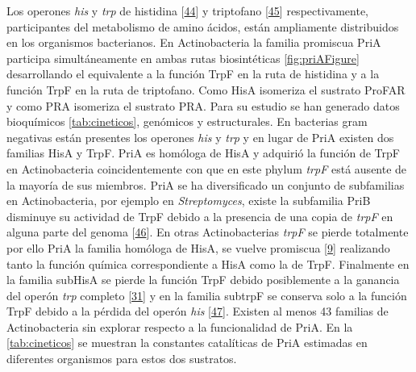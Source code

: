 \documentclass[12pt,twoside]{reedthesis}
\begin{document}
  Los operones \emph{his} y \emph{trp} de histidina
  {[}\protect\hyperlink{ref-fondi_evolution_2009}{44}{]} y triptofano
  {[}\protect\hyperlink{ref-merino_evolution_2008}{45}{]} respectivamente,
  participantes del metabolismo de amino ácidos, están ampliamente
  distribuidos en los organismos bacterianos. En Actinobacteria la familia
  promiscua PriA participa simultáneamente en ambas rutas biosintéticas
  \autoref{fig:priAFigure} desarrollando el equivalente a la función TrpF
  en la ruta de histidina y a la función TrpF en la ruta de triptofano.
  Como HisA isomeriza el sustrato ProFAR y como PRA isomeriza el sustrato
  PRA. Para su estudio se han generado datos bioquímicos
  \autoref{tab:cineticos}, genómicos y estructurales. En bacterias gram
  negativas están presentes los operones \emph{his} y \emph{trp} y en
  lugar de PriA existen dos familias HisA y TrpF. PriA es homóloga de HisA
  y adquirió la función de TrpF en Actinobacteria coincidentemente con que
  en este phylum \emph{trpF} está ausente de la mayoría de sus miembros.
  PriA se ha diversificado un conjunto de subfamilias en Actinobacteria,
  por ejemplo en \emph{Streptomyces}, existe la subfamilia PriB disminuye
  su actividad de TrpF debido a la presencia de una copia de \emph{trpF}
  en alguna parte del genoma
  {[}\protect\hyperlink{ref-verduzco-castro_co-occurrence_2016}{46}{]}. En
  otras Actinobacterias \emph{trpF} se pierde totalmente por ello PriA la
  familia homóloga de HisA, se vuelve promiscua
  {[}\protect\hyperlink{ref-baronagomez_occurrence_2003}{9}{]} realizando
  tanto la función química correspondiente a HisA como la de TrpF.
  Finalmente en la familia subHisA se pierde la función TrpF debido
  posiblemente a la ganancia del operón \emph{trp} completo
  {[}\protect\hyperlink{ref-noda-garcia_evolution_2013}{31}{]} y en la
  familia subtrpF se conserva solo a la función TrpF debido a la pérdida
  del operón \emph{his}
  {[}\protect\hyperlink{ref-juarez-vazquez_evolution_2017}{47}{]}. Existen
  al menos 43 familias de Actinobacteria sin explorar respecto a la
  funcionalidad de PriA. En la \autoref{tab:cineticos} se muestran la
  constantes catalíticas de PriA estimadas en diferentes organismos para
  estos dos sustratos.
  
  \clearpage    
  
\end{document}
